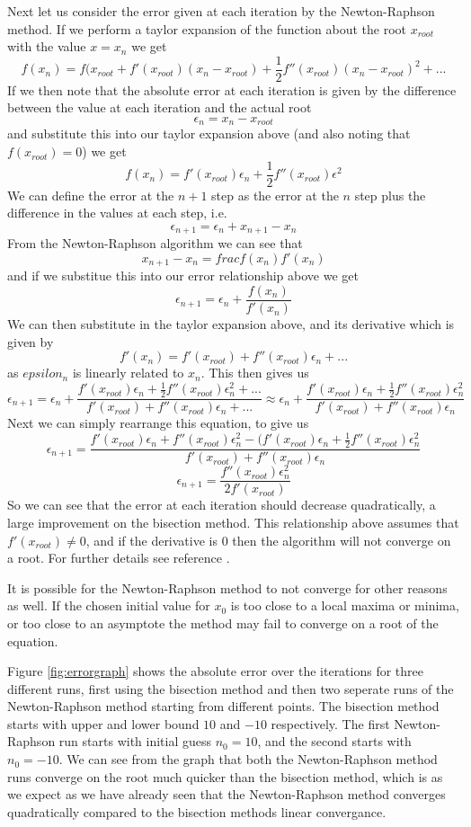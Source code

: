 \documentclass[a4paper,12pt]{UoBnote}
\begin{document}
Next let us consider the error given at each iteration by the Newton-Raphson method. If we perform a taylor expansion of the function about the root $x_{root}$ with the value $x=x_n$ we get
\[f(x_n)=f(x_{root}+f'(x_{root})(x_n-x_{root})+\frac{1}{2}f''(x_{root})(x_n-x_{root})^2+...\]
If we then note that the absolute error at each iteration is given by the difference between the value at each iteration and the actual root
\[\epsilon_n=x_n-x_{root}\]
and substitute this into our taylor expansion above (and also noting that $f(x_{root})=0$) we get
\[f(x_n)=f'(x_{root})\epsilon_n+\frac{1}{2}f''(x_{root})\epsilon^2\]
We can define the error at the $n+1$ step as the error at the $n$ step plus the difference in the values at each step, i.e.
\[\epsilon_{n+1}=\epsilon_n+x_{n+1}-x_n\]
From the Newton-Raphson algorithm we can see that
\[x_{n+1}-x_n=frac{f(x_n)}{f'(x_n)}\]
and if we substitue this into our error relationship above we get
\[\epsilon_{n+1}=\epsilon_n+\frac{f(x_n)}{f'(x_n)}\]
We can then substitute in the taylor expansion above, and its derivative which is given by
\[f'(x_n)=f'(x_{root})+f''(x_{root})\epsilon_n+...\]
as $epsilon_n$ is linearly related to $x_n$. This then gives us
\[\epsilon_{n+1}=\epsilon_n+\frac{f'(x_{root})\epsilon_n+\frac{1}{2}f''(x_{root})\epsilon_{n}^2+...}{f'(x_{root})+f''(x_{root})\epsilon_n+...}\approx \epsilon_n+\frac{f'(x_{root})\epsilon_n+\frac{1}{2}f''(x_{root})\epsilon_{n}^2}{f'(x_{root})+f''(x_{root})\epsilon_n}\]
Next we can simply rearrange this equation, to give us
\[\epsilon_{n+1}= \frac{f'(x_{root})\epsilon_n+f''(x_{root})\epsilon_{n}^2-(f'(x_{root})\epsilon_n+\frac{1}{2}f''(x_{root})\epsilon_{n}^2}{f'(x_{root})+f''(x_{root})\epsilon_n}\]
\[\epsilon_{n+1}=\frac{f''(x_{root})\epsilon_{n}^2}{2f'(x_{root})}\]
So we can see that the error at each iteration should decrease quadratically, a large improvement on the bisection method. This relationship above assumes that $f'(x_{root})\neq0$, and if the derivative is 0 then the algorithm will not converge on a root. For further details see reference \cite{newtonmethod}.

It is possible for the Newton-Raphson method to not converge for other reasons as well. If the chosen initial value for $x_0$ is too close to a local maxima or minima, or too close to an asymptote the method may fail to converge on a root of the equation.

Figure \ref{fig:errorgraph} shows the absolute error over the iterations for three different runs, first using the bisection method and then two seperate runs of the Newton-Raphson method starting from different points. The bisection method starts with upper and lower bound $10$ and $-10$ respectively. The first Newton-Raphson run starts with initial guess $n_0=10$, and the second starts with $n_0=-10$. We can see from the graph that both the Newton-Raphson method runs converge on the root much quicker than the bisection method, which is as we expect as we have already seen that the Newton-Raphson method converges quadratically compared to the bisection methods linear convergance. 
\end{document}
